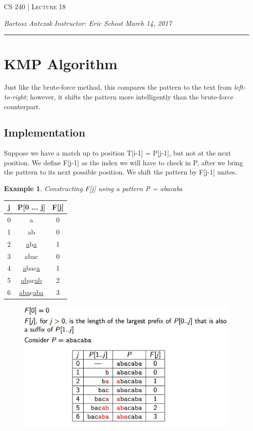 \documentclass{report}
\newcommand{\lectureNum}{18}
\newcommand{\curDate}{March 14, 2017}
\newcommand{\course}{CS 240}
\newtheorem{ex}{Example}[section]
\begin{document}
\begin{center}
\begin{Large}
\textsc{\course{} | Lecture \lectureNum{}}
\end{Large}
\end{center} 
\noindent \textit{Bartosz Antczak} \hfill
\textit{Instructor: Eric Schost} \hfill
\textit{\curDate{}}
\rule{\textwidth}{0.4pt}

\section{KMP Algorithm}
Just like the brute-force method, this compares the pattern to the text from \textit{left-to-right}; however, it shifts the pattern more intelligently than the brute-force counterpart.
\subsection{Implementation}
Suppose we have a match up to position T[i-1] = P[j-1], but not at the next position. We define F[j-1] as the index we will have to check in P, after we bring the pattern to its next possible position. We shift the pattern by F[j-1] unites.
\begin{ex}
Constructing F[j] using a pattern P = abacaba
\end{ex}
\begin{center}
\begin{tabular}{ c | c | c }
\hline
j & P[0 ... j] & F[j] \\\hline
0 & a & 0 \\
1 & ab & 0 \\
2 & \underline{a}b\underline{a} & 1 \\
3 & abac & 0 \\
4 & \underline{a}bac\underline{a} & 1 \\
5 & \underline{ab}ac\underline{ab} & 2 \\
6 & \underline{aba}c\underline{aba} & 3 \\
\end{tabular}
\end{center}
\begin{figure}[ht]
\begin{center}
\includegraphics[scale=0.4]{kmp1.jpg}
\end{center}
\end{figure}
\end{document}
